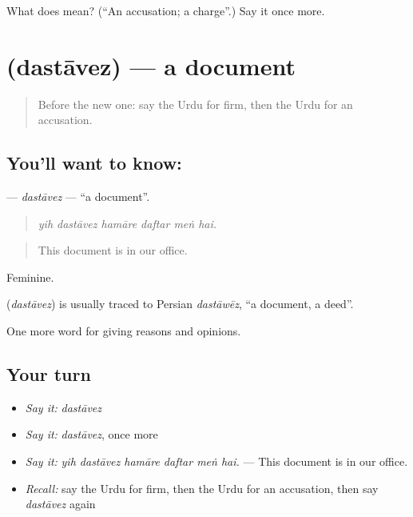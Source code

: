 \begin{tcolorbox}[breakable,colback=teal!4,colframe=teal!35!black,title={Before you move on}]
What does  mean? (\textquotedblleft{}An accusation; a charge\textquotedblright{}.) Say it once more.
\end{tcolorbox}
\section[\texorpdfstring{\ur{دستاویز} (dastāvez)}{دستاویز (dastāvez)}]{ (dastāvez) — a document}

\label{lesson:UR-C336-dastavez}



\begin{quote}
Before the new one: say the Urdu for firm, then the Urdu for an accusation.
\end{quote}

\subsection*{You'll want to know: }
\textbf{} — \emph{dastāvez} — \textquotedblleft{}a document\textquotedblright{}.

\begin{quote}
     
\end{quote}

\begin{quote}
\emph{yih dastāvez hamāre daftar meṅ hai.}
\end{quote}

\begin{quote}
This document is in our office.
\end{quote}

Feminine.

\begin{cousinweb}
\textbf{} (\emph{dastāvez}) is usually traced to Persian \emph{dastāwēz}, \textquotedblleft{}a document, a deed\textquotedblright{}.
\end{cousinweb}

\begin{grammarlens}[title={What you've built}]
One more word for giving reasons and opinions.
\end{grammarlens}

\subsection*{Your turn}
\begin{itemize}
\raggedright
  \item \emph{Say it:} \emph{dastāvez}
  \item \emph{Say it:} \emph{dastāvez}, once more
  \item \emph{Say it:} \emph{yih dastāvez hamāre daftar meṅ hai.} — This document is in our office.
  \item \emph{Recall:} say the Urdu for firm, then the Urdu for an accusation, then say \emph{dastāvez} again
\end{itemize}


